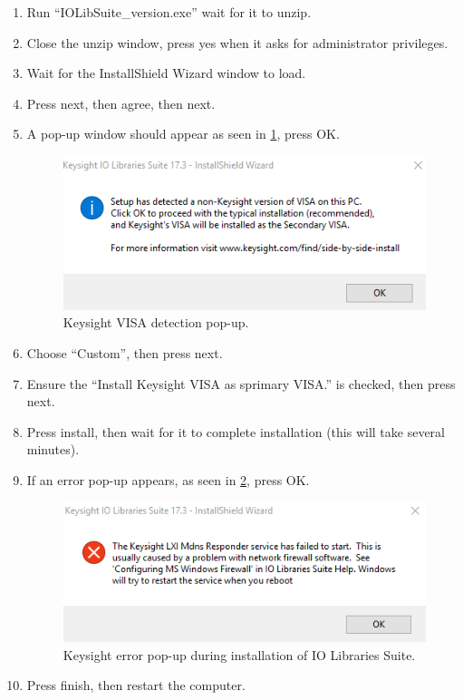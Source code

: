 \documentclass[11pt, letterpaper, titlepage]{article}
\begin{document}
\begin{enumerate}
    \item Run ``IOLibSuite\_version.exe'' wait for it to unzip.
    \item Close the unzip window, press yes when it asks for administrator privileges.
    \item Wait for the InstallShield Wizard window to load.
    \item Press next, then agree, then next.
    \item A pop-up window should appear as seen in \ref{fig:keysight_visa_popup}, press OK.
    \begin{figure}[h]
        \begin{center}
        \includegraphics[scale=0.80]{keysight_visa_popup.png}
        \caption{Keysight VISA detection pop-up.}
        \label{fig:keysight_visa_popup}
        \end{center}
    \end{figure}
    \item Choose ``Custom'', then press next.
    \item Ensure the ``Install Keysight VISA as sprimary VISA.'' is checked, then press next.
    \item Press install, then wait for it to complete installation (this will take several minutes).
    \item If an error pop-up appears, as seen in \ref{fig:keysight_install_error_popup}, press OK.
    \begin{figure}[h]
        \begin{center}
        \includegraphics[scale=0.80]{keysight_install_error_popup.png}
        \caption{Keysight error pop-up during installation of IO Libraries Suite.}
        \label{fig:keysight_install_error_popup}
        \end{center}
    \end{figure}
    \item Press finish, then restart the computer.
\end{enumerate}
\end{document}
